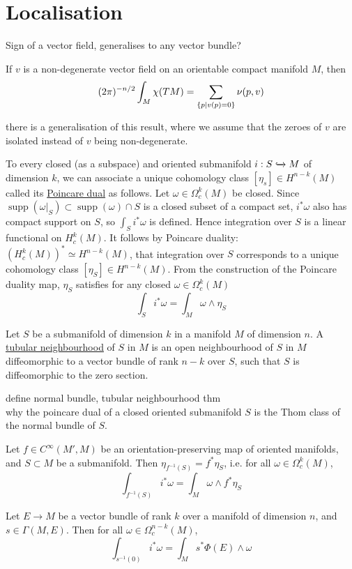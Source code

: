 \section{Localisation}
Sign of a vector field, generalises to any vector bundle?
\begin{thm} %
	If $v$ is a non-degenerate vector field on an orientable compact manifold
	$M$, then 
	\[
		 (2\pi)^{-n /2} \int_M \chi(TM) = \sum_{\set{p|v(p)=0}} \nu(p,v)	
	\] 
\end{thm}
there is a generalisation of this result, where we assume that the zeroes
of $v$ are isolated instead of $v$ being non-degenerate. 


To every closed (as a subspace) and oriented submanifold $i: S
\xhookrightarrow{} M$ of dimension  $k$, we can
associate a unique cohomology class  $[\eta_s]\in H^{n-k}(M)$ called its
\underline{Poincare dual} as follows. Let $\omega\in \Omega_c^k(M)$ be closed.
Since $\operatorname{supp}(\omega|_S) \subset \operatorname{supp}(\omega) \cap
S$ is a closed subset of a compact set, $i^*\omega$ also has compact support on
$S$, so  $\int_S i^*\omega$ is defined. Hence integration over  $S$ is a  
linear functional on $H^k_c(M)$. It follows by Poincare duality:
$(H_c^k(M))^*\simeq H^{n-k}(M)$, that integration over $S$ corresponds to a
unique cohomology class $[\eta_S]\in H^{n-k}(M)$. 
From the construction of the Poincare duality map, $\eta_S$ satisfies
for any closed $\omega\in \Omega^k_c(M)$
\[
\int_S i^*\omega = \int_M \omega \wedge \eta_S
\] 
\begin{defn}
	Let $S$ be a submanifold of dimension  $k$ in a manifold  $M$ of dimension
	$n$. A \underline{tubular neighbourhood} of  $S$ in  $M$ is an open
	neighbourhood of  $S$ in  $M$ diffeomorphic to a vector bundle of rank
	$n-k$ over  $S$, such that  $S$ is diffeomorphic to the zero section.
\end{defn}
define normal bundle, tubular neighbourhood thm \\
why the poincare dual of a closed oriented submanifold $S$ is the Thom class of
the normal bundle of $S$.
\begin{thm} %
	Let $f\in C^\infty(M',M)$ be an orientation-preserving map of oriented
	manifolds, and $S\subset M$ be a submanifold. Then $\eta_{f^{-1}(S)} =
	f^*\eta_S$, i.e. for all  $\omega\in \Omega^k_c(M)$,
	\[
	\int_{f^{-1}(S)} i^*\omega = \int_M \omega \wedge f^*\eta_S
	\] 
\end{thm}
\begin{cor} \label{cor:zero_localisation}
	Let $E\to M$ be a vector bundle of rank $k$ over a manifold of dimension $n$, 
	and $s\in\Gamma(M,E)$.
	Then for all $\omega\in \Omega^{n-k}_c(M)$,
	 \[
	\int_{s^{-1}(0)} i^*\omega = \int_M s^* \Phi(E) \wedge \omega
	\] 
\end{cor}

